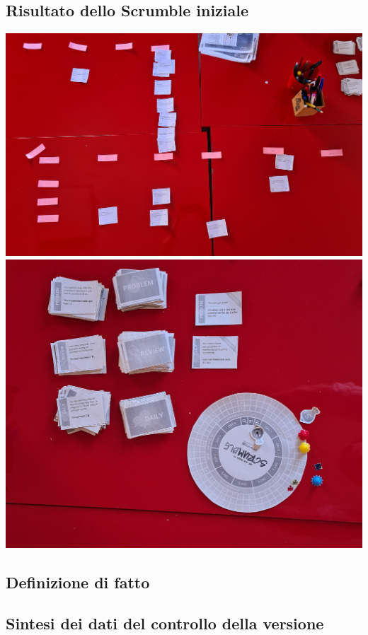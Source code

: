 \documentclass{article}
\begin{document}
\subsection{Risultato dello Scrumble iniziale}

\includegraphics[width=\textwidth]{scrumble}
\includegraphics[width=\textwidth]{scrumble-bis}

\subsection{Definizione di fatto}


\subsection{Sintesi dei dati del controllo della versione}
\end{document}
